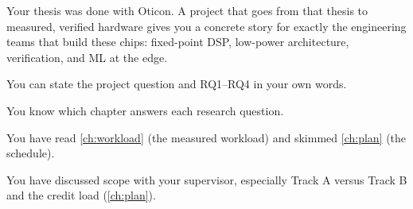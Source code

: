 Your thesis was done with Oticon. A project that goes from that thesis to
measured, verified hardware gives you a concrete story for exactly the
engineering teams that build these chips: fixed-point DSP, low-power
architecture, verification, and ML at the edge.

\begin{donebox}
\begin{checklist}
  \item You can state the project question and RQ1--RQ4 in your own words.
  \item You know which chapter answers each research question.
  \item You have read \cref{ch:workload} (the measured workload) and skimmed
        \cref{ch:plan} (the schedule).
  \item You have discussed scope with your supervisor, especially Track A
        versus Track B and the credit load (\cref{ch:plan}).
\end{checklist}
\end{donebox}
